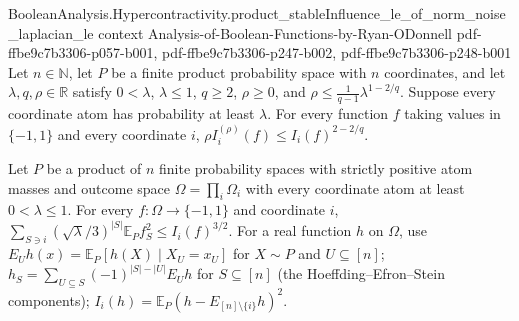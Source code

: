 \begin{theorem}
\proofstep
  {BooleanAnalysis.Hypercontractivity.product_stableInfluence_le_of_norm_noise_laplacian_le}
  {context}
  {Analysis-of-Boolean-Functions-by-Ryan-ODonnell}
  {pdf-ffbe9c7b3306-p057-b001,
    pdf-ffbe9c7b3306-p247-b002,
    pdf-ffbe9c7b3306-p248-b001}
Let $n\in\mathbb{N}$, let $P$ be a finite product probability space with $n$
coordinates, and let $\lambda,q,\rho\in\mathbb{R}$ satisfy $0<\lambda$, $\lambda\le 1$,
$q\ge 2$, $\rho\ge 0$, and $\rho\le \frac{1}{q-1}\lambda^{1-2/q}$. Suppose every
coordinate atom has probability at least $\lambda$. For every function $f$ taking values
in $\{-1,1\}$ and every coordinate $i$, $\rho I_i^{(\rho)}(f)\le I_i(f)^{2-2/q}$.
\end{theorem}

\begin{theorem}
\leanok
{}
Let $P$ be a product of $n$ finite probability spaces with strictly positive atom masses and outcome space $\Omega=\prod_i\Omega_i$ with every coordinate atom at least $0<\lambda\le1$. For every $f:\Omega\to\{-1,1\}$ and coordinate $i$, $\sum_{S\ni i}(\sqrt\lambda/3)^{|S|}\mathbb E_Pf_S^2\le I_i(f)^{3/2}$. For a real function $h$ on $\Omega$, use $E_Uh(x)=\mathbb E_P[h(X)\mid X_U=x_U]$ for $X\sim P$ and $U\subseteq[n]$; $h_S=\sum_{U\subseteq S}(-1)^{|S|-|U|}E_Uh$ for $S\subseteq[n]$ (the Hoeffding--Efron--Stein components); $I_i(h)=\mathbb E_P(h-E_{[n]\setminus\{i\}}h)^2$.
\end{theorem}

